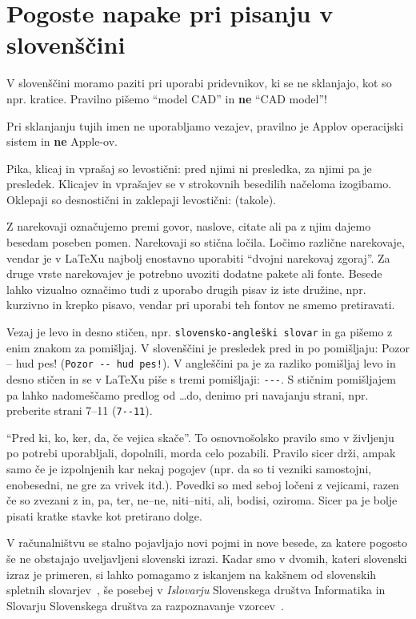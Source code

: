 \documentclass[a4paper,12pt,openright]{book}
\begin{document}
\chapter{Pogoste napake pri pisanju v slovenščini}  %
\label{slo}

V slovenščini moramo paziti  pri uporabi pridevnikov, ki se ne sklanjajo, kot so npr. kratice. 
Pravilno pišemo ``model CAD'' in \textbf{ne} ``CAD model''!

Pri sklanjanju tujih imen ne uporabljamo vezajev, pravilno je Applov operacijski sistem in \textbf{ne} Apple-ov.

Pika, klicaj in vprašaj so levostični: pred njimi ni presledka, za njimi pa je presledek. 
Klicajev in vprašajev se v strokovnih besedilih načeloma izogibamo. Oklepaji so desnostični in zaklepaji levostični: (takole).

Z narekovaji označujemo premi govor, naslove, citate ali pa z njim dajemo besedam poseben pomen. Narekovaji so stična ločila. Ločimo različne narekovaje, vendar je v
\LaTeX u najbolj enostavno uporabiti ``dvojni narekovaj zgoraj''. Za druge vrste narekovajev je potrebno uvoziti dodatne pakete ali fonte.
Besede lahko vizualno označimo tudi z uporabo drugih pisav  iz iste družine, npr. 
kurzivno in krepko pisavo, vendar pri uporabi teh fontov ne smemo pretiravati.

Vezaj  je levo in desno stičen, npr. \verb=slovensko-angleški slovar= in ga pišemo z enim znakom za pomišljaj.
V slovenščini je presledek pred in po pomišljaju: Pozor -- hud pes! (\verb=Pozor -- hud pes!=).
V angleščini pa je za razliko pomišljaj levo in desno stičen in se v \LaTeX u piše s tremi  pomišljaji: \verb=---=.
S stičnim pomišljajem pa lahko nadomeščamo predlog od \dots do, denimo pri navajanju strani, npr. preberite strani 7--11 (\verb=7--11=).

``Pred ki, ko, ker, da, če vejica skače''. 
To osnovnošolsko pravilo smo v življenju po potrebi uporabljali, dopolnili, morda celo pozabili. 
Pravilo sicer drži, ampak samo če je izpolnjenih kar nekaj pogojev (npr. da so ti vezniki samostojni, enobesedni, ne gre za vrivek itd.).
Povedki so med seboj ločeni z vejicami, razen če so zvezani z in, pa, ter, ne–ne, niti–niti, ali, bodisi, oziroma.
Sicer pa je bolje pisati kratke stavke kot pretirano dolge.

V računalništvu se stalno pojavljajo novi pojmi in nove besede, za katere pogosto še ne obstajajo uveljavljeni slovenski izrazi.
Kadar smo v dvomih, kateri slovenski izraz je primeren, si lahko pomagamo z iskanjem na kakšnem od slovenskih spletnih slovarjev~\cite{slovarji}, še posebej v
\textit{Islovarju} Slovenskega društva Informatika \cite{Islovar} in Slovarju Slovenskega društva za razpoznavanje vzorcev~\cite{sdrv}.
\end{document}
